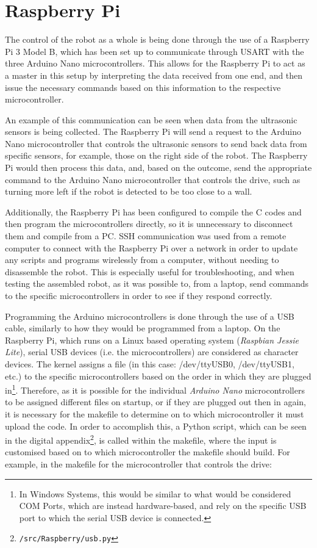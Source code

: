\documentclass[11pt]{article}
\begin{document}
\section{Raspberry Pi}
The control of the robot as a whole is being done through the use of a Raspberry Pi 3 Model B, which has been set up to communicate through USART with the three Arduino Nano microcontrollers. This allows for the Raspberry Pi to act as a master in this setup by interpreting the data received from one end, and then issue the necessary commands based on this information to the respective microcontroller.


An example of this communication can be seen when data from the ultrasonic sensors is being collected. The Raspberry Pi will send a request to the Arduino Nano microcontroller that controls the ultrasonic sensors to send back data from specific sensors, for example, those on the right side of the robot. The Raspberry Pi would then process this data, and, based on the outcome, send the appropriate command to the Arduino Nano microcontroller that controls the drive, such as turning more left if the robot is detected to be too close to a wall.


Additionally, the Raspberry Pi has been configured to compile the C codes and then program the microcontrollers directly, so it is unnecessary to disconnect them and compile from a PC. SSH communication was used from a remote computer to connect with the Raspberry Pi over a network in order to update any scripts and programs wirelessly from a computer, without needing to disassemble the robot. This is especially useful for troubleshooting, and when testing the assembled robot, as it was possible to, from a laptop, send commands to the specific microcontrollers in order to see if they respond correctly.


Programming the Arduino microcontrollers is done through the use of a USB cable, similarly to how they would be programmed from a laptop. On the Raspberry Pi, which runs on a Linux based operating system (\textit{Raspbian Jessie Lite}), serial USB devices (i.e. the microcontrollers) are considered as character devices. The kernel assigns a file (in this case: /dev/ttyUSB0, /dev/ttyUSB1, etc.) to the specific microcontrollers based on the order in which they are plugged in\footnote{In Windows Systems, this would be similar to what would be considered COM Ports, which are instead hardware-based, and rely on the specific USB port to which the serial USB device is connected.}. Therefore, as it is possible for the individual \textit{Arduino Nano} microcontrollers to be assigned different files on startup, or if they are plugged out then in again, it is necessary for the makefile to determine on to which microcontroller it must upload the code. In order to accomplish this, a Python script, which can be seen in the digital appendix\footnote{\texttt{/src/Raspberry/usb.py}}, is called within the makefile, where the input is customised based on to which microcontroller the makefile should build. For example, in the makefile for the microcontroller that controls the drive:
\end{document}

